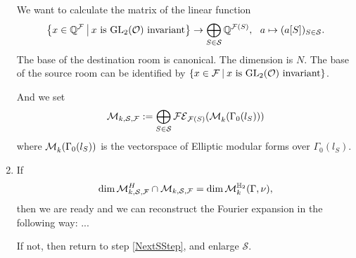 \begin{algo}
\begin{enumerate}
We want to calculate the matrix of the linear function \[
\invar{\Q^\F}{\GL_2(\curlO)} \rightarrow \bigoplus_{S\in\mathcal{S}} \Q^{\F(S)}, \ \ 
a \mapsto (a[S])_{S\in\mathcal{S}} .
\]
The base of the destination room is canonical. The dimension is $N$.
The base of the source room can be identified by $\invar{\F}{\GL_2(\curlO)}$.

And we set
\[ \mathcal{M}_{k, \mathcal{S},\mathcal{F}} := \bigoplus_{S\in\mathcal{S}} \mathcal{FE}_{\mathcal{F}(S)}(\operatorname{\mathcal{M}}^{}_k (\Gamma_0(l_S))) \]
where $\operatorname{\mathcal{M}}^{}_k (\Gamma_0(l_S))$ is the vectorspace of Elliptic modular forms over $\Gamma_0(l_S)$. %

\item
If
\[ \dim \mathcal{M}_{k,\mathcal{S},\mathcal{F}}^H \cap \mathcal{M}_{k, \mathcal{S},\mathcal{F}}
= \dim \operatorname{\mathcal{M}}^{\mathbb{H}_{2}}_k (\Gamma,\nu) , \]
then we are ready and we can reconstruct the Fourier expansion in the following way: ...

If not, then return to step \ref{NextSStep}, and enlarge $\mathcal{S}$.
\end{enumerate}
\end{algo}


